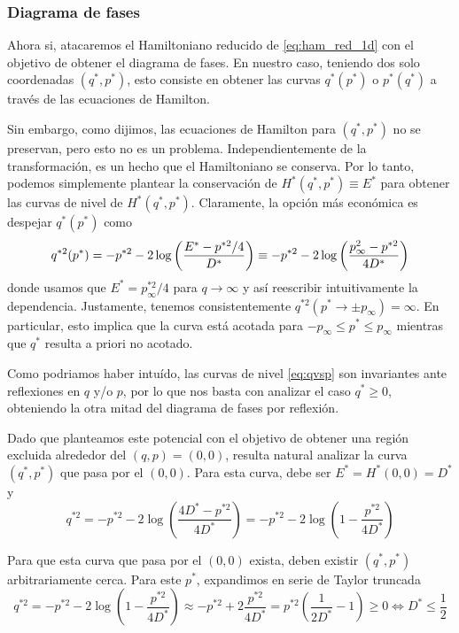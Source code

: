 \subsubsection{Diagrama de fases}{\label{sec:teo_fases}}

Ahora si, atacaremos el Hamiltoniano reducido de \eqref{eq:ham_red_1d} con el objetivo de obtener el diagrama de fases.
En nuestro caso, teniendo dos solo coordenadas $(q^*,p^*)$, esto consiste en obtener las curvas $q^*(p^*)$ o $p^*(q^*)$ a través de las ecuaciones de Hamilton.

Sin embargo, como dijimos, las ecuaciones de Hamilton para $(q^*,p^*)$ no se preservan, pero esto no es un problema.
Independientemente de la transformación, es un hecho que el Hamiltoniano se conserva.
Por lo tanto, podemos simplemente plantear la conservación de $H^*(q^*,p^*)\equiv E^*$ para obtener las curvas de nivel de $H^*(q^*,p^*)$.
Claramente, la opción más económica es despejar $q^*(p^*)$ como
\begin{equation}{\label{eq:qvsp}}
q^{*2}(p^*) = -p^{*2} - 2 \log\left( \frac{E^*-p^{*2}/4}{D^*} \right) \equiv -p^{*2} - 2 \log\left( \frac{p_\infty^2-p^{*2}}{4D^*} \right)
\end{equation}
donde usamos que $E^* = p_\infty^{*2}/4$ para $q\to\infty$ y así reescribir intuitivamente la dependencia.
Justamente, tenemos consistentemente $q^{*2}(p^*\to\pm p_\infty) = \infty$.
En particular, esto implica que la curva está acotada para $-p_\infty \leq p^* \leq p_\infty$ mientras que $q^*$ resulta a priori no acotado.

Como podriamos haber intuído, las curvas de nivel \eqref{eq:qvsp} son invariantes ante reflexiones en $q$ y/o $p$, por lo que nos basta con analizar el caso $q^*\geq 0$, obteniendo la otra mitad del diagrama de fases por reflexión.

Dado que planteamos este potencial con el objetivo de obtener una región excluida alrededor del $(q,p)=(0,0)$, resulta natural analizar la curva $(q^*,p^*)$ que pasa por el $(0,0)$.
Para esta curva, debe ser $E^* = H^*(0,0) = D^*$ y
\[ q^{*2} = -p^{*2} - 2\log\left( \frac{4D^*-p^{*2}}{4D^*} \right)
= -p^{*2} - 2\log\left( 1-\frac{p^{*2}}{4D^*} \right) \]

Para que esta curva que pasa por el $(0,0)$ exista, deben existir $(q^*, p^*)$ arbitrariamente cerca.
Para este $p^*$, expandimos en serie de Taylor truncada
\[ q^{*2} = -p^{*2} - 2\log\left( 1-\frac{p^{*2}}{4D^*} \right) \approx -p^{*2} + 2\frac{p^{*2}}{4D^*}  = p^{*2} \left( \frac{1}{2D^*} -1 \right) \geq 0 \Longleftrightarrow D^* \leq \frac{1}{2} \]

